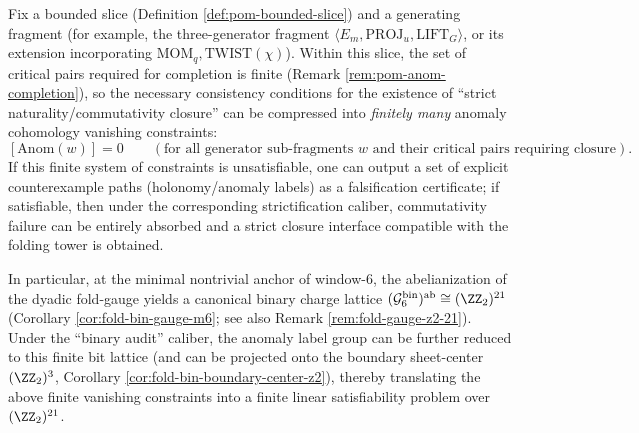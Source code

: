\begin{proposition}\label{prop:pom-finite-falsifier-anom}
Fix a bounded slice (Definition \ref{def:pom-bounded-slice}) and a generating fragment (for example, the three-generator fragment \(\langle E_m,\mathrm{PROJ}_u,\mathrm{LIFT}_G\rangle\), or its extension incorporating \(\mathrm{MOM}_q,\mathrm{TWIST}(\chi)\)).
Within this slice, the set of critical pairs required for completion is finite (Remark \ref{rem:pom-anom-completion}), so the necessary consistency conditions for the existence of ``strict naturality/commutativity closure'' can be compressed into \emph{finitely many} anomaly cohomology vanishing constraints:
\[
[\mathrm{Anom}(w)] = 0\qquad(\text{for all generator sub-fragments }w\text{ and their critical pairs requiring closure}).
\]
If this finite system of constraints is unsatisfiable, one can output a set of explicit counterexample paths (holonomy/anomaly labels) as a falsification certificate; if satisfiable, then under the corresponding strictification caliber, commutativity failure can be entirely absorbed and a strict closure interface compatible with the folding tower is obtained.
\par
In particular, at the minimal nontrivial anchor of window-\(6\), the abelianization of the dyadic fold-gauge yields a canonical binary charge lattice
\(
(\mathcal{G}^{\mathrm{bin}}_6)^{\mathrm{ab}}\cong (\ZZ_2)^{21}
\)
(Corollary \ref{cor:fold-bin-gauge-m6}; see also Remark \ref{rem:fold-gauge-z2-21}).
Under the ``binary audit'' caliber, the anomaly label group can be further reduced to this finite bit lattice (and can be projected onto the boundary sheet-center \((\ZZ_2)^3\), Corollary \ref{cor:fold-bin-boundary-center-z2}),
thereby translating the above finite vanishing constraints into a finite linear satisfiability problem over \((\ZZ_2)^{21}\).
\end{proposition}

